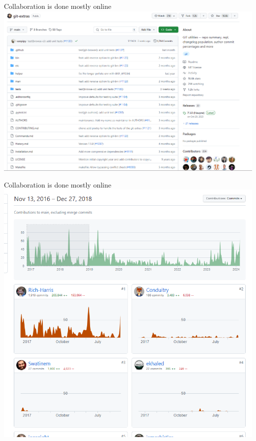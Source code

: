 \documentclass[
  ignorenonframetext,
  aspectratio=169,
]{beamer}
\begin{document}
\begin{frame}{Collaboration is done mostly online}
\protect\hypertarget{collaboration-is-done-mostly-online}{}
\includegraphics{images/github-example.png}
\end{frame}

\begin{frame}{Collaboration is done mostly online}
\protect\hypertarget{collaboration-is-done-mostly-online-1}{}
\includegraphics{images/collab-example-2017-19.png}
\end{frame}
\end{document}
